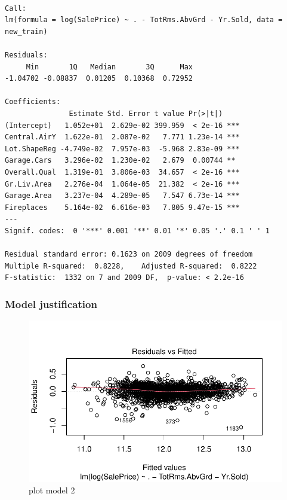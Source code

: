 \documentclass[
  letterpaper,
  DIV=11,
  numbers=noendperiod]{scrartcl}
\begin{document}
\begin{verbatim}

Call:
lm(formula = log(SalePrice) ~ . - TotRms.AbvGrd - Yr.Sold, data = new_train)

Residuals:
     Min       1Q   Median       3Q      Max 
-1.04702 -0.08837  0.01205  0.10368  0.72952 

Coefficients:
               Estimate Std. Error t value Pr(>|t|)    
(Intercept)   1.052e+01  2.629e-02 399.959  < 2e-16 ***
Central.AirY  1.622e-01  2.087e-02   7.771 1.23e-14 ***
Lot.ShapeReg -4.749e-02  7.957e-03  -5.968 2.83e-09 ***
Garage.Cars   3.296e-02  1.230e-02   2.679  0.00744 ** 
Overall.Qual  1.319e-01  3.806e-03  34.657  < 2e-16 ***
Gr.Liv.Area   2.276e-04  1.064e-05  21.382  < 2e-16 ***
Garage.Area   3.237e-04  4.289e-05   7.547 6.73e-14 ***
Fireplaces    5.164e-02  6.616e-03   7.805 9.47e-15 ***
---
Signif. codes:  0 '***' 0.001 '**' 0.01 '*' 0.05 '.' 0.1 ' ' 1

Residual standard error: 0.1623 on 2009 degrees of freedom
Multiple R-squared:  0.8228,    Adjusted R-squared:  0.8222 
F-statistic:  1332 on 7 and 2009 DF,  p-value: < 2.2e-16
\end{verbatim}

\subsubsection{Model justification}\label{model-justification}

\begin{figure}[H]

{\centering \includegraphics{paper_files/figure-pdf/plotmodel2-1.pdf}

}

\caption{plot model 2}

\end{figure}%
\end{document}
